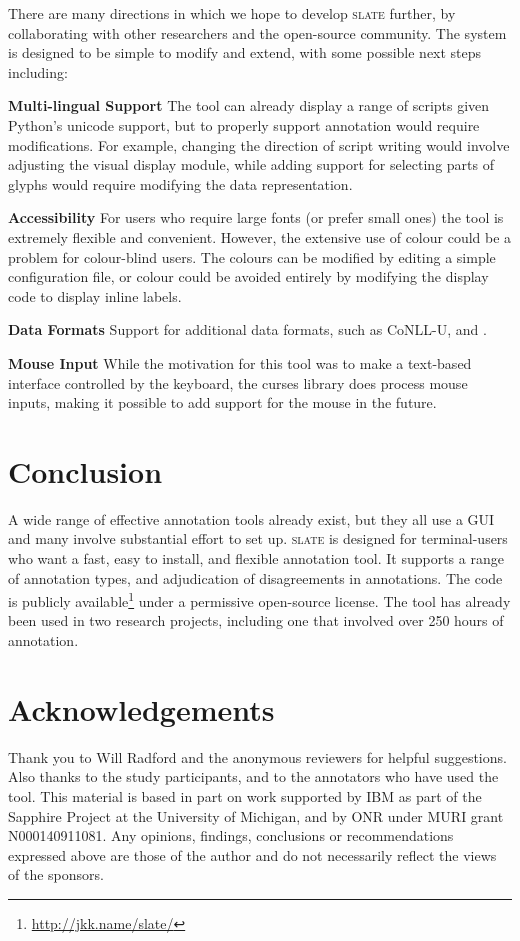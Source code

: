 \documentclass[11pt,a4paper]{article}
\newcommand{\tightparagraph}[1]{\noindent\textbf{#1}}
\newcommand\slate{\textsc{slate}\xspace}
\begin{document}
There are many directions in which we hope to develop \slate further, by collaborating with other researchers and the open-source community.
The system is designed to be simple to modify and extend, with some possible next steps including:

\tightparagraph{Multi-lingual Support}
The tool can already display a range of scripts given Python's unicode support, but to properly support annotation would require modifications.
For example, changing the direction of script writing would involve adjusting the visual display module, while adding support for selecting parts of glyphs would require modifying the data representation.

\tightparagraph{Accessibility}
For users who require large fonts (or prefer small ones) the tool is extremely flexible and convenient.
However, the extensive use of colour could be a problem for colour-blind users.
The colours can be modified by editing a simple configuration file, or colour could be avoided entirely by modifying the display code to display inline labels.

\tightparagraph{Data Formats}
Support for additional data formats, such as CoNLL-U, and \citet{data-iso}.

\tightparagraph{Mouse Input}
While the motivation for this tool was to make a text-based interface controlled by the keyboard, the curses library does process mouse inputs, making it possible to add support for the mouse in the future.

\section{Conclusion}

A wide range of effective annotation tools already exist, but they all use a GUI and many involve substantial effort to set up.
\slate is designed for terminal-users who want a fast, easy to install, and flexible annotation tool.
It supports a range of annotation types, and adjudication of disagreements in annotations.
The code is publicly available\footnote{\url{http://jkk.name/slate/}} under a permissive open-source license.
The tool has already been used in two research projects, including one that involved over 250 hours of annotation.

\section*{Acknowledgements}

Thank you to Will Radford and the anonymous reviewers for helpful suggestions.
Also thanks to the study participants, and to the annotators who have used the tool.
This material is based in part on work supported by IBM as part of the Sapphire Project at the University of Michigan, and by ONR under MURI grant N000140911081.
Any opinions, findings, conclusions or recommendations expressed above are those of the author and do not necessarily reflect the views of the sponsors.



\end{document}
